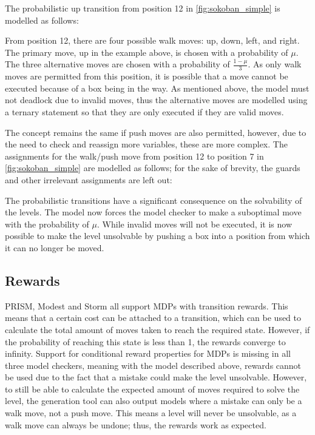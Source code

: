 The probabilistic up transition from position 12 in \autoref{fig:sokoban_simple} is modelled as follows:

From position 12, there are four possible walk moves: up, down, left, and right. The primary move, up in the example above, is chosen with a probability of $\mu$. The three alternative moves are chosen with a probability of $\frac{1 - \mu}{3}$. As only walk moves are permitted from this position, it is possible that a move cannot be executed because of a box being in the way. As mentioned above, the model must not deadlock due to invalid moves, thus the alternative moves are modelled using a ternary statement so that they are only executed if they are valid moves.

The concept remains the same if push moves are also permitted, however, due to the need to check and reassign more variables, these are more complex. The assignments for the walk/push move from position 12 to position 7 in \autoref{fig:sokoban_simple} are modelled as follows; for the sake of brevity, the guards and other irrelevant assignments are left out:


The probabilistic transitions have a significant consequence on the solvability of the levels. The model now forces the model checker to make a suboptimal move with the probability of $\mu$. While invalid moves will not be executed, it is now possible to make the level unsolvable by pushing a box into a position from which it can no longer be moved.

\subsection{Rewards}
\label{sec:rewards}
PRISM, Modest and Storm all support MDPs with transition rewards. This means that a certain cost can be attached to a transition, which can be used to calculate the total amount of moves taken to reach the required state. However, if the probability of reaching this state is less than 1, the rewards converge to infinity. Support for conditional reward properties for MDPs is missing in all three model checkers, meaning with the model described above, rewards cannot be used due to the fact that a mistake could make the level unsolvable. However, to still be able to calculate the expected amount of moves required to solve the level, the generation tool can also output models where a mistake can only be a walk move, not a push move. This means a level will never be unsolvable, as a walk move can always be undone; thus, the rewards work as expected.

